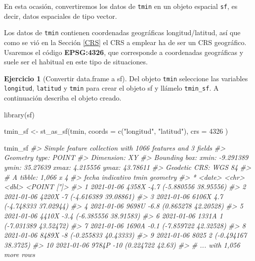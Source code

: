 \documentclass[
]{report}
\newenvironment{Shaded}{\begin{snugshade}}{\end{snugshade}}
\newcommand{\AttributeTok}[1]{\textcolor[rgb]{0.77,0.63,0.00}{#1}}
\newcommand{\CommentTok}[1]{\textcolor[rgb]{0.56,0.35,0.01}{\textit{#1}}}
\newcommand{\DecValTok}[1]{\textcolor[rgb]{0.00,0.00,0.81}{#1}}
\newcommand{\FunctionTok}[1]{\textcolor[rgb]{0.00,0.00,0.00}{#1}}
\newcommand{\NormalTok}[1]{#1}
\newcommand{\OtherTok}[1]{\textcolor[rgb]{0.56,0.35,0.01}{#1}}
\newcommand{\StringTok}[1]{\textcolor[rgb]{0.31,0.60,0.02}{#1}}
\theoremstyle{definition}
\theoremstyle{definition}
\theoremstyle{definition}
\newtheorem{exercise}{Ejercicio}[chapter]
\theoremstyle{definition}
\theoremstyle{remark}
\begin{document}
En esta ocasión, convertiremos los datos de \texttt{tmin} en un objeto espacial \texttt{sf},
es decir, datos espaciales de tipo vector.

Los datos de \texttt{tmin} contienen coordenadas geográficas longitud/latitud, así que
como se vió en la Sección \ref{CRS} el CRS a emplear ha de ser un CRS
geográfico. Usaremos el código \textbf{EPSG:4326}, que corresponde a coordenadas
geográficas y suele ser el habitual en este tipo de situaciones.

\begin{exercise}[Convertir data.frame a sf]
\protect\hypertarget{exr:ex5}{}\label{exr:ex5}Del objeto \texttt{tmin} seleccione las variables \texttt{longitud}, \texttt{latitud} y \texttt{tmin} para
crear el objeto sf y llámelo \texttt{tmin\_sf}. A continuación describa el objeto
creado.
\end{exercise}

\begin{Shaded}
\begin{Highlighting}[]
\FunctionTok{library}\NormalTok{(sf)}

\NormalTok{tmin\_sf }\OtherTok{\textless{}{-}} \FunctionTok{st\_as\_sf}\NormalTok{(tmin,}
  \AttributeTok{coords =} \FunctionTok{c}\NormalTok{(}\StringTok{"longitud"}\NormalTok{, }\StringTok{"latitud"}\NormalTok{),}
  \AttributeTok{crs =} \DecValTok{4326}
\NormalTok{)}

\NormalTok{tmin\_sf}
\CommentTok{\#\textgreater{} Simple feature collection with 1066 features and 3 fields}
\CommentTok{\#\textgreater{} Geometry type: POINT}
\CommentTok{\#\textgreater{} Dimension:     XY}
\CommentTok{\#\textgreater{} Bounding box:  xmin: {-}9.291389 ymin: 35.27639 xmax: 4.215556 ymax: 43.78611}
\CommentTok{\#\textgreater{} Geodetic CRS:  WGS 84}
\CommentTok{\#\textgreater{} \# A tibble: 1,066 x 4}
\CommentTok{\#\textgreater{}    fecha      indicativo  tmin             geometry}
\CommentTok{\#\textgreater{}  * \textless{}date\textgreater{}     \textless{}chr\textgreater{}      \textless{}dbl\textgreater{}          \textless{}POINT [°]\textgreater{}}
\CommentTok{\#\textgreater{}  1 2021{-}01{-}06 4358X       {-}4.7 ({-}5.880556 38.95556)}
\CommentTok{\#\textgreater{}  2 2021{-}01{-}06 4220X       {-}7   ({-}4.616389 39.08861)}
\CommentTok{\#\textgreater{}  3 2021{-}01{-}06 6106X        4.7 ({-}4.748333 37.02944)}
\CommentTok{\#\textgreater{}  4 2021{-}01{-}06 9698U       {-}6.8  (0.865278 42.20528)}
\CommentTok{\#\textgreater{}  5 2021{-}01{-}06 4410X       {-}3.4 ({-}6.385556 38.91583)}
\CommentTok{\#\textgreater{}  6 2021{-}01{-}06 1331A        1   ({-}7.031389 43.52472)}
\CommentTok{\#\textgreater{}  7 2021{-}01{-}06 1690A       {-}0.1 ({-}7.859722 42.32528)}
\CommentTok{\#\textgreater{}  8 2021{-}01{-}06 8489X       {-}8   ({-}0.255833 40.43333)}
\CommentTok{\#\textgreater{}  9 2021{-}01{-}06 8025         2    ({-}0.494167 38.3725)}
\CommentTok{\#\textgreater{} 10 2021{-}01{-}06 9784P      {-}10       (0.224722 42.63)}
\CommentTok{\#\textgreater{} \# ... with 1,056 more rows}
\end{Highlighting}
\end{Shaded}
\end{document}
